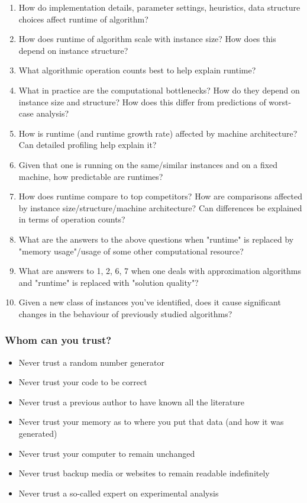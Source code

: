\begin{enumerate}
    \item How do implementation details, parameter settings, heuristics, data structure choices affect runtime of algorithm?
    \item How does runtime of algorithm scale with instance size? How does this depend on instance structure?
    \item What algorithmic operation counts best to help explain runtime?
    \item What in practice are the computational bottlenecks? How do they depend on instance size and structure? How does this differ from predictions of worst-case analysis?
    \item How is runtime (and runtime growth rate) affected by machine architecture? Can detailed profiling help explain it?
    \item Given that one is running on the same/similar instances and on a fixed machine, how predictable are runtimes?
    \item How does runtime compare to top competitors? How are comparisons affected by instance size/structure/machine architecture? Can differences be explained in terms of operation counts?
    \item What are the answers to the above questions when "runtime" is replaced by "memory usage"/usage of some other computational resource?
    \item What are answers to 1, 2, 6, 7 when one deals with approximation algorithms and "runtime" is replaced with "solution quality"?
    \item Given a new class of instances you've identified, does it cause significant changes in the behaviour of previously studied algorithms?
\end{enumerate}

\subsubsection{Whom can you trust?}

\begin{itemize}
    \item Never trust a random number generator
    \item Never trust your code to be correct
    \item Never trust a previous author to have known all the literature 
    \item Never trust your memory as to where you put that data (and how it was generated)
    \item Never trust your computer to remain unchanged
    \item Never trust backup media or websites to remain readable indefinitely
    \item Never trust a so-called expert on experimental analysis
\end{itemize}

